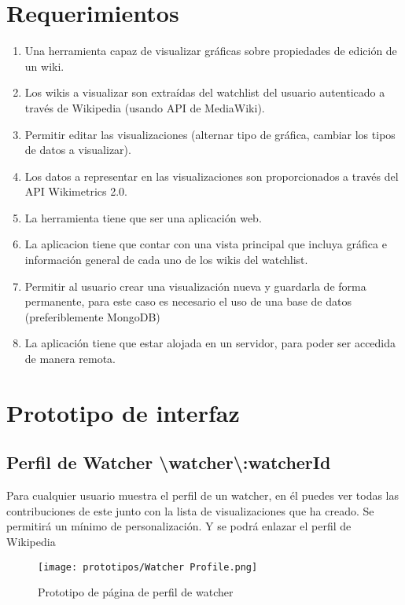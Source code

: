 \section{Requerimientos}
\begin{enumerate}
    \item{Una herramienta capaz de visualizar gráficas sobre propiedades de edición de un wiki.}
    \item{Los wikis a visualizar son extraídas del watchlist del usuario autenticado a través de Wikipedia (usando API de MediaWiki).}
    \item{Permitir editar las visualizaciones (alternar tipo de gráfica, cambiar los tipos de datos a visualizar).}
    \item{Los datos a representar en las visualizaciones son proporcionados a través del API Wikimetrics 2.0.}
    \item{La herramienta tiene que ser una aplicación web.}
    \item{La aplicacion tiene que contar con una vista principal que incluya gráfica e información general de cada uno de los wikis del watchlist.}
    \item{Permitir al usuario crear una visualización nueva y guardarla de forma permanente, para este caso es necesario el uso de una base de datos (preferiblemente MongoDB)}
    \item{La aplicación tiene que estar alojada en un servidor, para poder ser accedida de manera remota.}
\end{enumerate}

\section{Prototipo de interfaz}

\subsection{Perfil de Watcher \textbackslash watcher\textbackslash:watcherId}
Para cualquier usuario muestra el perfil de un watcher, en él puedes ver todas las contribuciones de este junto con la lista de visualizaciones que ha creado.
Se permitirá un mínimo de personalización. Y se podrá enlazar el perfil de Wikipedia

\begin{figure}[H]
    \centering
    \texttt{[image: prototipos/Watcher Profile.png]}
    \caption{Prototipo de página de perfil de watcher}
    \label{PrototipoWatchersProfile}
\end{figure}

